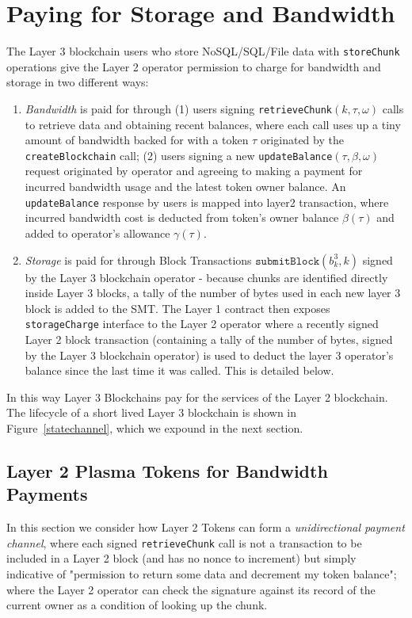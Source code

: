 \documentclass{article}
\newcommand{\blockhash}[2]{b^{#1}_{#2}}
\newcommand{\signature}{\omega}
\newcommand{\allowance}{\gamma}
\newcommand{\submitblock}[2]{\texttt{submitBlock}(#2, #1)}
\newcommand{\balance}{\beta}
\begin{document}
\section{Paying for Storage and Bandwidth}
The Layer 3 blockchain users who store NoSQL/SQL/File data with
\texttt{storeChunk} operations give the Layer 2 operator permission to charge for bandwidth and storage in two different ways:

\begin{enumerate}
\item {\em Bandwidth} is paid for through (1) users signing  \texttt{retrieveChunk}$(k, \tau, \signature)$ calls to retrieve data and obtaining recent balances, where each call uses up a tiny amount of bandwidth backed for with a token $\tau$ originated by the \texttt{createBlockchain} call; (2) users signing a new \texttt{updateBalance}$(\tau, \balance, \signature)$ request originated by operator and agreeing to making a payment for incurred bandwidth usage and the latest token owner balance. An \texttt{updateBalance} response by users is mapped into layer2 transaction, where incurred bandwidth cost is deducted from token's owner balance $\balance(\tau)$ and added to operator's allowance $\allowance(\tau)$.

\item {\em Storage} is paid for through Block Transactions $\submitblock{k}{\blockhash{3}{k}}$ signed by the Layer 3 blockchain operator - because chunks are identified directly inside Layer 3 blocks, a tally of the number of bytes used in each new layer 3 block is added to the SMT.  The Layer 1 contract then exposes \texttt{storageCharge} interface to the Layer 2 operator where a recently signed Layer 2 block transaction (containing a tally of the number of bytes, signed by the Layer 3 blockchain operator) is used to deduct the layer 3 operator's balance since the last time it was called.   This is detailed below.
\end{enumerate}
In this way Layer 3 Blockchains pay for the services of the Layer 2 blockchain.  The lifecycle of a short lived Layer 3 blockchain is shown in Figure~\ref{statechannel}, which we expound in the next section.

\subsection{Layer 2 Plasma Tokens for Bandwidth Payments}

In this section we  consider how Layer 2 Tokens can form a {\em unidirectional payment channel}, where each signed \texttt{retrieveChunk} call is not a transaction to be included in a Layer 2 block (and has no nonce to increment) but simply indicative of "permission to return some data and decrement my token balance"; where the Layer 2 operator can check the signature against its record of the current owner as a condition of looking up the chunk.
\end{document}
